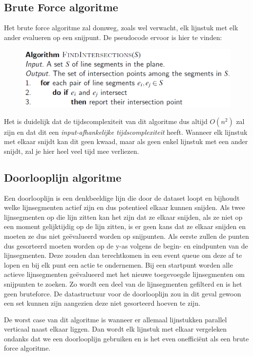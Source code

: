 \documentclass[12pt,a4paper]{article}
\begin{document}
	\subsection{Brute Force algoritme}
	Het brute force algoritme zal domweg, zoals wel verwacht, elk lijnstuk met elk ander evalueren op een snijpunt. De pseudocode ervoor is hier te vinden:
	\begin{figure}[h]
		\centering
		\includegraphics[width=0.8\linewidth]{afbeeldingen/find-Intersections}
		\label{fig:find-intersections}
	\end{figure}
	Het is duidelijk dat de tijdscomplexiteit van dit algoritme dus altijd $O(n^2)$ zal zijn en dat dit een \textit{input-afhankelijke tijdscomplexiteit} heeft. Wanneer elk lijnstuk met elkaar snijdt kan dit geen kwaad, maar als geen enkel lijnstuk met een ander snijdt, zal je hier heel veel tijd mee verliezen. 
	
	
	\subsection{Doorlooplijn algoritme}
	Een doorlooplijn is een denkbeeldige lijn die door de dataset loopt en bijhoudt welke lijnsegmenten actief zijn en dus potentieel elkaar kunnen snijden. Als twee lijnsegmenten op die lijn zitten kan het zijn dat ze elkaar snijden, als ze niet op een moment gelijktijdig op de lijn zitten, is er geen kans dat ze elkaar snijden en moeten ze dus niet geëvalueerd worden op snijpunten. Als eerste zullen de punten dus gesorteerd moeten worden op de y-as volgens de begin- en eindpunten van de lijnsegmenten. Deze zouden dan terechtkomen in een event queue om deze af te lopen en bij elk punt een actie te ondernemen. Bij een startpunt worden alle actieve lijnsegmenten geëvalueerd met het nieuwe toegevoegde lijnsegmenten om snijpunten te zoeken. Zo wordt een deel van de lijnsegmenten gefilterd en is het geen bruteforce. De datastructuur voor de doorlooplijn zou in dit geval gewoon een set kunnen zijn aangezien deze niet gesorteerd hoeven te zijn. 
	
	De worst case van dit algoritme is wanneer er allemaal lijnstukken parallel verticaal naast elkaar liggen. Dan wordt elk lijnstuk met elkaar vergeleken ondanks dat we een doorlooplijn gebruiken en is het even onefficiënt als een brute force algoritme. 
		
\end{document}
